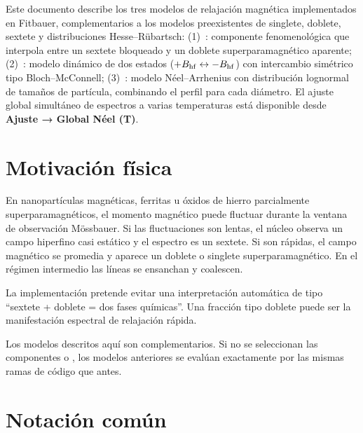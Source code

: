 \noindent
Este documento describe los tres modelos de relajación magnética implementados
en Fitbauer, complementarios a los modelos preexistentes de singlete, doblete,
sextete y distribuciones Hesse--Rübartsch:
(1)~: componente fenomenológica que interpola entre un sextete
bloqueado y un doblete superparamagnético aparente;
(2)~: modelo dinámico de dos estados ($+B_{\mathrm{hf}} \leftrightarrow -B_{\mathrm{hf}}$)
con intercambio simétrico tipo Bloch--McConnell;
(3)~: modelo Néel--Arrhenius con distribución lognormal de tamaños
de partícula, combinando el perfil  para cada diámetro.
El ajuste global simultáneo de espectros a varias temperaturas está disponible
desde \textbf{Ajuste → Global Néel (T)}.



\bigskip

\section{Motivación física}

En nanopartículas magnéticas, ferritas u óxidos de hierro parcialmente
superparamagnéticos, el momento magnético puede fluctuar durante la ventana de
observación Mössbauer. Si las fluctuaciones son lentas, el núcleo observa un
campo hiperfino casi estático y el espectro es un sextete. Si son rápidas, el
campo magnético se promedia y aparece un doblete o singlete superparamagnético.
En el régimen intermedio las líneas se ensanchan y coalescen.

La implementación pretende evitar una interpretación automática de tipo
``sextete + doblete = dos fases químicas''. Una fracción tipo doblete puede ser
la manifestación espectral de relajación rápida.

\begin{aviso}
Los modelos descritos aquí son complementarios. Si no se seleccionan las
componentes  o , los modelos anteriores se
evalúan exactamente por las mismas ramas de código que antes.
\end{aviso}

\section{Notación común}

